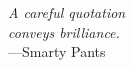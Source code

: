 %
\begin{frontmatter}

%
%
\makefrontmatter

%
%
%
%
%
%


%
%



%
%
\begin{epigraph} %
  \emph{A careful quotation\\
  conveys brilliance.}\\
  ---Smarty Pants
\end{epigraph}

%



\end{frontmatter}

